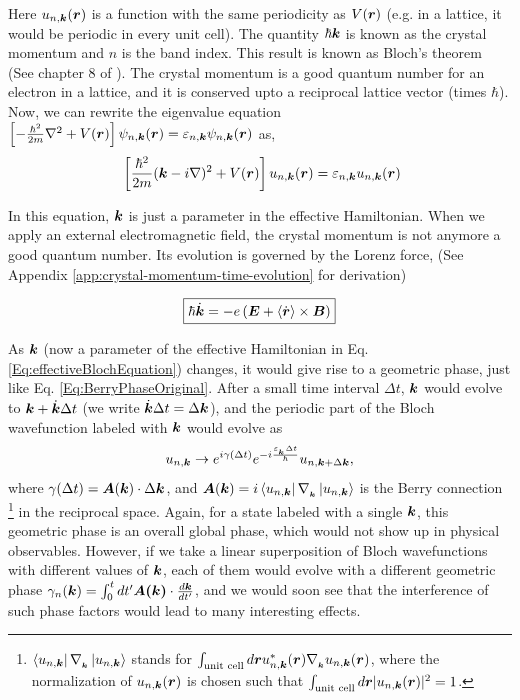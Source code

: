 \documentclass{report}
\renewcommand\vec[1]{\ensuremath\boldsymbol{#1}} %
\begin{document}
Here $u_{n,\vec{k}} (\vec{r})$ is a function with the same periodicity as $V(\vec{r})$ (e.g. in a lattice, it would be periodic in every unit cell). The quantity $\hbar \vec{k}$ is known as the crystal momentum and $n$ is the band index. This result is known as Bloch's theorem (See chapter 8 of \cite{book:AshcroftMermin76}). The crystal momentum is a good quantum number for an electron in a lattice, and it is conserved upto a reciprocal lattice vector (times $\hbar$).
Now, we can rewrite the eigenvalue equation $\left[-\frac{\hbar^2}{2m}\nabla^2 + V(\vec{r}) \right] \psi_{n, \vec{k}}(\vec{r}) = \varepsilon_{n,\vec{k}} \psi_{n, \vec{k}}(\vec{r})$ as,
\begin{equation}~\label{Eq:effectiveBlochEquation}
	\left[\frac{\hbar^2}{2m}(\vec{k} - i \nabla)^2 + V(\vec{r}) \right]u_{n,\vec{k}} (\vec{r}) = \varepsilon_{n,\vec{k}} u_{n,\vec{k}} (\vec{r})
\end{equation}

In this equation, $\vec{k}$ is just a parameter in the effective Hamiltonian. When we apply an external electromagnetic field, the crystal momentum is not anymore a good quantum number. Its evolution is governed by the Lorenz force, (See Appendix \ref{app:crystal-momentum-time-evolution} for derivation)

\begin{equation} \label{Eq:evolution-of-k}
	\boxed{\hbar \dot{\vec{k}} = -e\left(\vec{E} + \langle\dot{\vec{r}}\rangle \times \vec{B} \right)}
\end{equation}

As $\vec{k}$ (now a parameter of the effective Hamiltonian in Eq. \ref{Eq:effectiveBlochEquation}) changes, it would give rise to a geometric phase, just like Eq. \ref{Eq:BerryPhaseOriginal}. After a small time interval $\Delta t$, $\vec{k}$ would evolve to $\vec{k} + \dot{\vec{k}} \Delta t$ (we write $\dot{\vec{k}} \Delta t = \Delta \vec{k} $), and the periodic part of the Bloch wavefunction labeled with $\vec{k}$ would evolve as 
\begin{equation}\label{Eq:u-n-k-time-evolution}
	u_{n, \vec{k}} \rightarrow e^{i \gamma(\Delta t)} e^{-i \frac{\varepsilon_{_{\vec{k}}} \Delta t}{\hbar}} u_{n, \vec{k}+\Delta \vec{k}},
\end{equation} where $\gamma(\Delta t) =\vec{A}(\vec{k}) \cdot \Delta \vec{k}$, and $ \vec{A}(\vec{k})=i \bra{u_{n,\vec{k}}}\nabla_{_{\vec{k}}} \ket{u_{n,\vec{k}}}$ is the Berry connection \footnote{ $\bra{u_{n,\vec{k}}}\nabla_{_{\vec{k}}} \ket{u_{n,\vec{k}}}$ stands for $\int_\text{unit cell} d\vec{r} u^*_{n,\vec{k}} (\vec{r}) \nabla_{_{\vec{k}}} u_{n,\vec{k}}(\vec{r})$, where the normalization of $u_{n,\vec{k}}(\vec{r})$ is chosen such that $\int_\text{unit cell} d\vec{r} |u_{n,\vec{k}} (\vec{r})|^2 = 1$.} in the reciprocal space. Again, for a state labeled with a single $\vec{k}$, this geometric phase is an overall global phase, which would not show up in physical observables. However, if we take a linear superposition of Bloch wavefunctions with different values of $\vec{k}$, each of them would evolve with a different geometric phase $\gamma_n (\vec{k}) = \int_{0}^{t} dt' \vec{A(\vec{k})} \cdot \frac{d \vec{k}}{dt'} $, and we would soon see that the interference of such phase factors would lead to many interesting effects.
\end{document}
